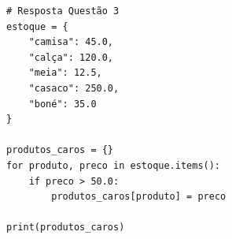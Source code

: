 \ifmostrarGabarito
\begin{verbatim}
# Resposta Questão 3
estoque = {
    "camisa": 45.0,
    "calça": 120.0,
    "meia": 12.5,
    "casaco": 250.0,
    "boné": 35.0
}

produtos_caros = {}
for produto, preco in estoque.items():
    if preco > 50.0:
        produtos_caros[produto] = preco

print(produtos_caros)
\end{verbatim}
\fi
